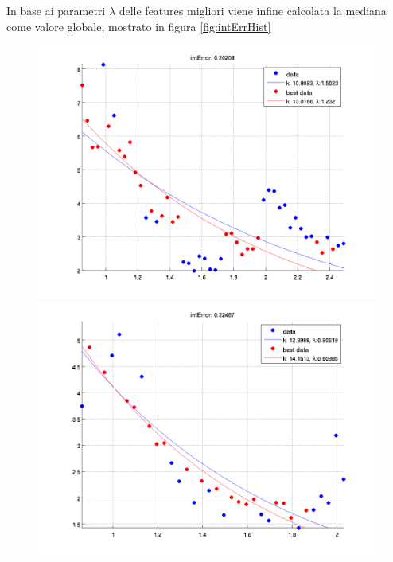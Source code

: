\documentclass[12pt]{report}
\begin{document}
\noindent In base ai parametri $\lambda$ delle features migliori viene infine calcolata la mediana come valore globale, mostrato in figura \ref{fig:intErrHist}

\newcommand{\imFeatBW}{.48}
\begin{figure}[H]
\begin{minipage}[t]{0.5\linewidth}
	\centering
	\includegraphics[scale=\imFeatBW]{images/best1}\\
	\includegraphics[scale=\imFeatBW]{images/best3}\\

\end{minipage}
\end{figure}
\end{document}
